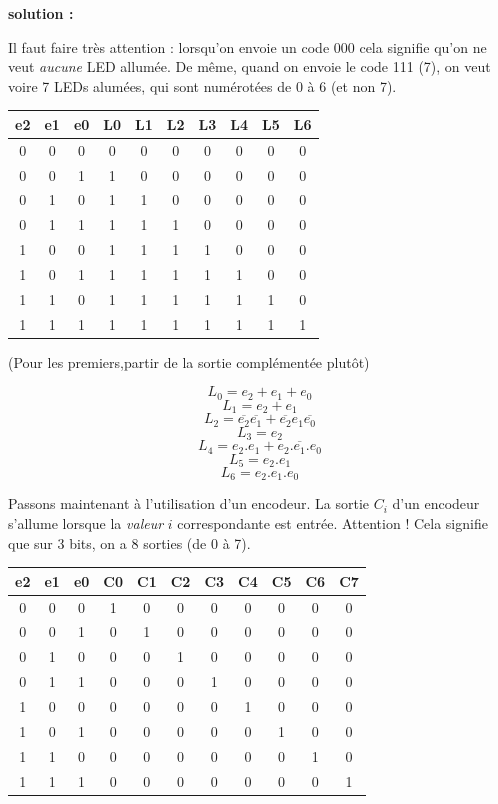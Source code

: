\documentclass[a4paper,11pt]{article}
\begin{document}
\begin{cadre}
{\bf solution : }

Il faut faire très attention : lorsqu'on envoie un code 000 cela signifie qu'on ne veut {\it aucune} LED allumée.
De même, quand on envoie le code 111 (7), on veut voire 7 LEDs alumées, qui sont numérotées de 0 à 6 (et non 7).

\begin{tabular}{|ccc|ccccccc|}
\hline
e2 & e1 & e0 & L0 & L1 & L2 & L3 & L4 & L5 & L6 \\ \hline
0 & 0 & 0 & 0 & 0 & 0 & 0 & 0 & 0 & 0 \\
0 & 0 & 1 & 1 & 0 & 0 & 0 & 0 & 0 & 0 \\
0 & 1 & 0 & 1 & 1 & 0 & 0 & 0 & 0 & 0 \\
0 & 1 & 1 & 1 & 1 & 1 & 0 & 0 & 0 & 0 \\
1 & 0 & 0 & 1 & 1 & 1 & 1 & 0 & 0 & 0 \\
1 & 0 & 1 & 1 & 1 & 1 & 1 & 1 & 0 & 0 \\
1 & 1 & 0 & 1 & 1 & 1 & 1 & 1 & 1 & 0 \\
1 & 1 & 1 & 1 & 1 & 1 & 1 & 1 & 1 & 1 \\ \hline
\end{tabular}

(Pour les premiers,partir de la sortie complémentée plutôt)

$$L_0=e_2+e_1+e_0$$
$$L_1=e_2+e_1$$
$$L_2=\overline{e_2}\overline{e_1}+\overline{e_2}e_1\overline{e_0}$$
$$L_3=e_2$$
$$L_4=e_2.e_1+e_2.\overline{e_1}.e_0$$
$$L_5=e_2.e_1$$
$$L_6=e_2.e_1.e_0$$

Passons maintenant à l'utilisation d'un encodeur. La sortie $C_i$ d'un encodeur s'allume lorsque la {\it valeur} $i$ correspondante est entrée. Attention ! Cela signifie que sur 3 bits, on a 8 sorties (de 0 à 7).\\

\begin{tabular}{|ccc|cccccccc|}
\hline
e2 & e1 & e0 & C0 & C1 & C2 & C3 & C4 & C5 & C6 & C7 \\ \hline
0 & 0 & 0 & 1 & 0 & 0 & 0 & 0 & 0 & 0 & 0 \\
0 & 0 & 1 & 0 & 1 & 0 & 0 & 0 & 0 & 0 & 0  \\
0 & 1 & 0 & 0 & 0 & 1 & 0 & 0 & 0 & 0 & 0 \\
0 & 1 & 1 & 0 & 0 & 0 & 1 & 0 & 0 & 0 & 0 \\
1 & 0 & 0 & 0 & 0 & 0 & 0 & 1 & 0 & 0 & 0 \\
1 & 0 & 1 & 0 & 0 & 0 & 0 & 0 & 1 & 0 & 0 \\
1 & 1 & 0 & 0 & 0 & 0 & 0 & 0 & 0 & 1 & 0 \\
1 & 1 & 1 & 0 & 0 & 0 & 0 & 0 & 0 & 0 & 1 \\ \hline
\end{tabular}
\newline


\end{cadre}
\end{document}

